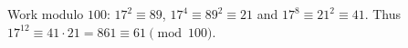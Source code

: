 Work modulo $100$: $17^2\equiv89$, $17^4\equiv89^2\equiv21$ and $17^8\equiv21^2\equiv41$. Thus $17^{12}\equiv41\cdot21=861\equiv\boxed{61}\pmod{100}$.
